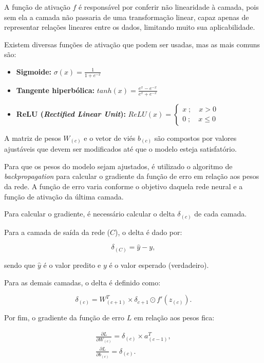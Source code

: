 A função de ativação $f$ é responsável por conferir não linearidade à camada, pois sem ela a camada não passaria de uma transformação linear, capaz apenas de representar relações lineares entre os dados, limitando muito sua aplicabilidade.

Existem diversas funções de ativação que podem ser usadas, mas as mais comuns são:

\begin{itemize}
    \item \textbf{Sigmoide:} $\sigma (x) = \frac{1}{1+e^{-x}}$
    \item \textbf{Tangente hiperbólica:} $tanh(x) = \frac{e^x-e^{-x}}{e^x+e^{-x}}$
    \item \textbf{ReLU (\textit{Rectified Linear Unit}):} $ReLU(x) = 
    \begin{cases}
        x \; ; \quad x>0 \\
        0 \; ; \quad x \le 0
    \end{cases}$
\end{itemize}

A matriz de pesos $W_{(c)}$ e o vetor de viés $b_{(c)}$ são compostos por valores ajustáveis que devem ser modificados até que o modelo esteja satisfatório.

Para que os pesos do modelo sejam ajustados, é utilizado o algoritmo de \textit{backpropagation} para calcular o gradiente da função de erro em relação aos pesos da rede. A função de erro varia conforme o objetivo daquela rede neural e a função de ativação da última camada.

Para calcular o gradiente, é necessário calcular o delta $\delta_{(c)}$ de cada camada.

Para a camada de saída da rede ($C$), o delta é dado por:

\begin{equation}
    \delta_{(C)} = \hat{y} - y,
\end{equation}

sendo que $\hat{y}$ é o valor predito e $y$ é o valor esperado (verdadeiro).

Para as demais camadas, o delta é definido como:

\begin{equation}
    \delta_{(c)} = W_{(c+1)}^T \times \delta_{c+1} \odot f'(z_{(c)}).
\end{equation}

Por fim, o gradiente da função de erro $L$ em relação aos pesos fica:

\begin{gather}
    \frac{\partial L}{\partial W_{(c)}} = \delta_{(c)} \times a_{(c-1)}^T, \\
    \frac{\partial L}{\partial b_{(c)}} = \delta_{(c)}.
\end{gather}

